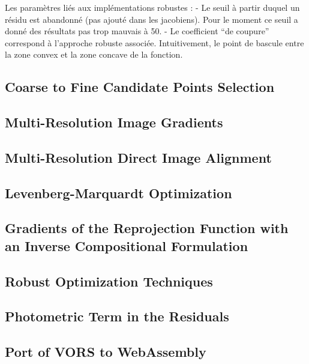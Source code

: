 Les paramètres liés aux implémentations robustes :
- Le seuil à partir duquel un résidu est abandonné (pas ajouté dans les jacobiens). Pour le moment ce seuil a donné des résultats pas trop mauvais à 50.
- Le coefficient “de coupure” correspond à l’approche robuste associée. Intuitivement, le point de bascule entre la zone convex et la zone concave de la fonction.

\subsection{Coarse to Fine Candidate Points Selection}%
\label{sub:candidates}

\subsection{Multi-Resolution Image Gradients}%
\label{sub:multires-gradients}

\subsection{Multi-Resolution Direct Image Alignment}%
\label{sub:multires-direct-image-alignment}

\subsection{Levenberg-Marquardt Optimization}%
\label{sub:lm-optimization}

\subsection{Gradients of the Reprojection Function with an Inverse Compositional Formulation}%
\label{sub:gradients-inverse-compostional}

\subsection{Robust Optimization Techniques}%
\label{sub:robust-optim}

\subsection{Photometric Term in the Residuals}%
\label{sub:photometric-residual}

\subsection{Port of VORS to WebAssembly}%
\label{sub:vors-port-wasm}

